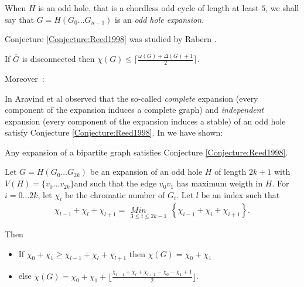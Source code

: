 \documentclass{amsart}
\theoremstyle{definition}
\theoremstyle{remark}
\begin{document}
 When $H$ is an odd hole, that is a chordless odd cycle of length at least $5$, we shall say that $G=H(G_0\ldots G_{n-1})$ is an {\em odd hole expansion}.




Conjecture \ref{Conjecture:Reed1998} was  studied by Rabern \cite{Rab2008}.

\begin{thm}\cite{Rab2008} \label{Theorem:Complement}If $\overline{G}$ is disconnected then
$\chi(G) \leq \lceil \frac{\omega(G)+\Delta(G) +1}{2}\rceil$.
\end{thm}

 Moreover~:



In \cite{AraKarSub2011} Aravind et al observed that the so-called {\em complete} expansion (every component of the expansion induces a complete graph) and {\em independent} expansion 
(every component of the expansion induces a stable) of an odd hole satisfy  Conjecture \ref{Conjecture:Reed1998}.
In \cite{FouVan2011} we have shown:

\begin{thm} \cite{FouVan2011} \label{Theorem:ReedsForBipartiteExpansion}
Any expansion of a bipartite graph satisfies  Conjecture \ref{Conjecture:Reed1998}.
\end{thm}


\begin{thm}\cite{FouVan2011} \label{Theorem:ChromaticNumberExpansionOddHole}
Let $G=H(G_0\ldots G_{2k})$ be an expansion of an odd hole $H$ of length $2k+1$ with $V(H)=\{v_0\ldots v_{2k}\}$and such that the edge $v_0v_1$ has maximum weigth in $H$. For $i=0\ldots {2k}$, 
let $\chi_i$ be the chromatic number of $G_i$.
Let $l$ be an index such that
$$\chi_{l-1}+\chi_l+\chi_{l+1}=\begin{matrix}\; \\ Min \\  _{3\leq i\leq 2k-1}\end{matrix} \left \{\chi_{i-1}+\chi_i+\chi_{i+1}\right \}.$$

Then
\begin{itemize}
 \item If $\chi_{0}+\chi_{1}\geq \chi_{l-1}+\chi_{l}+\chi_{l+1}$ then $\chi(G)=\chi_{0}+\chi_{1}$
 \item else $\chi(G)=\chi_{0}+\chi_{1}+\lfloor\frac{\chi_{l-1}+\chi_l+\chi_{l+1}-\chi_{0}-\chi_{1}+1}{2}\rfloor$.
\end{itemize}
\end{thm}
\end{document}
